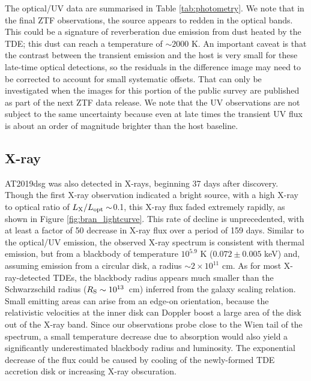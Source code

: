 The optical/UV data are summarised in Table \ref{tab:photometry}. We note that in the final ZTF observations, the source appears to redden in the optical bands. This could be a signature of reverberation due emission from dust heated by the TDE\cite{2016ApJ...829...19V,2016MNRAS.458..575L}; this dust can reach a temperature of $\sim 2000$ K. An important caveat is that the contrast between the transient emission and the host is very small for these late-time optical detections, so the residuals in the difference image may need to be corrected to account for small systematic offsets. That can only be investigated when the images for this portion of the public survey are published as part of the next ZTF data release. We note that the UV observations are not subject to the same uncertainty because even at late times the transient UV flux is about an order of magnitude brighter than the host baseline.

\subsection{X-ray}

AT2019dsg was also detected in X-rays, beginning 37 days after discovery. Though the first X-ray observation indicated a bright source, with a high X-ray to optical ratio of $L_{\textup{X}}/L_{\textup{opt}} \sim $0.1, this X-ray flux faded extremely rapidly, as shown in Figure \ref{fig:bran_lightcurve}. This rate of decline is unprecedented, with at least a factor of 50 decrease in X-ray flux over a period of 159 days. Similar to the optical/UV emission, the observed X-ray spectrum is consistent with thermal emission, but from a blackbody of temperature $10^{5.9}$ K ($0.072 \pm 0.005$ keV) and, assuming emission from a circular disk, a radius $\sim 2 \times 10^{11}$ cm. As for most X-ray-detected TDEs\cite{2017ApJ...838..149A, 2019MNRAS.487.4136W,2019ApJ...872..198V}, the blackbody radius appears much smaller than the Schwarzschild radius ($R_{\textup{S}} \sim 10^{13}$~cm) inferred from the galaxy scaling relation\cite{2013ApJ...764..184M}. Small emitting areas can arise from an edge-on orientation, because the relativistic velocities at the inner disk can Doppler boost a large area of the disk out of the X-ray band.  Since our observations probe close to the Wien tail of the spectrum, a small temperature decrease due to absorption would also yield a significantly underestimated blackbody radius and luminosity\cite{2019ApJ...872..198V}. The exponential decrease of the flux could be caused by cooling of the newly-formed TDE accretion disk\cite{2020MNRAS.492.5655M} or increasing X-ray obscuration.

